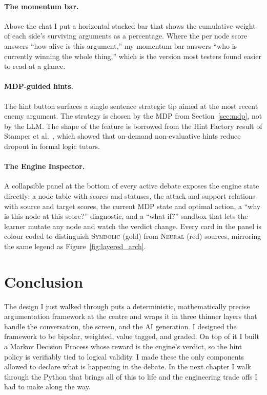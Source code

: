 \paragraph{The momentum bar.} Above the chat I put a horizontal stacked bar that shows the cumulative weight of each side's surviving arguments as a percentage. Where the per node score answers ``how alive is this argument,'' my momentum bar answers ``who is currently winning the whole thing,'' which is the version most testers found easier to read at a glance.

\paragraph{MDP-guided hints.} The hint button surfaces a single sentence strategic tip aimed at the most recent enemy argument. The strategy is chosen by the MDP from Section~\ref{sec:mdp}, not by the LLM. The shape of the feature is borrowed from the Hint Factory result of Stamper et al.~\cite{stamper2011hints}, which showed that on-demand non-evaluative hints reduce dropout in formal logic tutors.

\paragraph{The Engine Inspector.} A collapsible panel at the bottom of every active debate exposes the engine state directly: a node table with scores and statuses, the attack and support relations with source and target scores, the current MDP state and optimal action, a ``why is this node at this score?'' diagnostic, and a ``what if?'' sandbox that lets the learner mutate any node and watch the verdict change. Every card in the panel is colour coded to distinguish \textsc{Symbolic} (gold) from \textsc{Neural} (red) sources, mirroring the same legend as Figure~\ref{fig:layered_arch}.

\section{Conclusion}
The design I just walked through puts a deterministic, mathematically precise argumentation framework at the centre and wraps it in three thinner layers that handle the conversation, the screen, and the AI generation. I designed the framework to be bipolar, weighted, value tagged, and graded. On top of it I built a Markov Decision Process whose reward is the engine's verdict, so the hint policy is verifiably tied to logical validity. I made these the only components allowed to declare what is happening in the debate. In the next chapter I walk through the Python that brings all of this to life and the engineering trade offs I had to make along the way.

